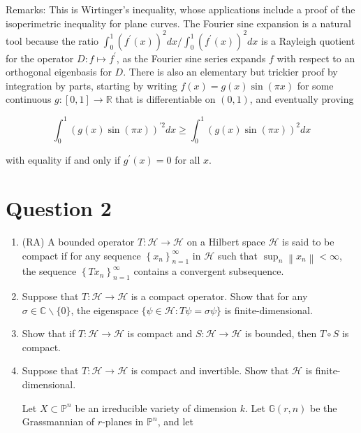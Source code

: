 \documentclass{article}
\begin{document}
Remarks: This is Wirtinger's inequality, whose applications include a proof of the isoperimetric inequality for plane curves. The Fourier sine expansion is a natural tool because the ratio $\int_{0}^{1}\left(f^{\prime}(x)\right)^{2} d x / \int_{0}^{1}\left(f^{\prime}(x)\right)^{2} d x$ is a Rayleigh quotient for the operator $D: f \mapsto f^{\prime}$, as the Fourier sine series expands $f$ with
respect to an orthogonal eigenbasis for $D$. There is also an elementary but trickier proof by integration by parts, starting by writing $f(x)=g(x) \sin (\pi x)$ for some continuous $g:[0,1] \rightarrow \mathbb{R}$ that is differentiable on $(0,1)$, and eventually proving

$$
\int_{0}^{1}(g(x) \sin (\pi x))^{\prime 2} d x \geq \int_{0}^{1}(g(x) \sin (\pi x))^{2} d x
$$

with equality if and only if $g^{\prime}(x)=0$ for all $x$.

\section{Question 2}

\begin{enumerate}

  \item (RA) A bounded operator $T: \mathcal{H} \rightarrow \mathcal{H}$ on a Hilbert space $\mathcal{H}$ is said to be compact if for any sequence $\left\{x_{n}\right\}_{n=1}^{\infty}$ in $\mathcal{H}$ such that $\sup _{n}\left\|x_{n}\right\|<\infty$, the sequence $\left\{T x_{n}\right\}_{n=1}^{\infty}$ contains a convergent subsequence.

  \item Suppose that $T: \mathcal{H} \rightarrow \mathcal{H}$ is a compact operator. Show that for any $\sigma \in \mathbb{C} \backslash\{0\}$, the eigenspace $\{\psi \in \mathcal{H}: T \psi=\sigma \psi\}$ is finite-dimensional.

  \item Show that if $T: \mathcal{H} \rightarrow \mathcal{H}$ is compact and $S: \mathcal{H} \rightarrow \mathcal{H}$ is bounded, then $T \circ S$ is compact.

  \item Suppose that $T: \mathcal{H} \rightarrow \mathcal{H}$ is compact and invertible. Show that $\mathcal{H}$ is finite-dimensional.

  Let $X \subset \mathbb{P}^{n}$ be an irreducible variety of dimension $k$. Let $\mathbb{G}(r, n)$ be the Grassmannian of $r$-planes in $\mathbb{P}^{n}$, and let

\end{enumerate}
\end{document}
